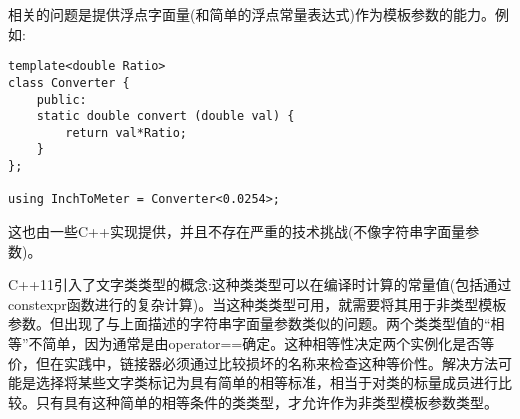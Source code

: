 相关的问题是提供浮点字面量(和简单的浮点常量表达式)作为模板参数的能力。例如:

\begin{lstlisting}[style=styleCXX]
template<double Ratio>
class Converter {
	public:
	static double convert (double val) {
		return val*Ratio;
	}
};

using InchToMeter = Converter<0.0254>;
\end{lstlisting}

这也由一些C++实现提供，并且不存在严重的技术挑战(不像字符串字面量参数)。

C++11引入了文字类类型的概念:这种类类型可以在编译时计算的常量值(包括通过constexpr函数进行的复杂计算)。当这种类类型可用，就需要将其用于非类型模板参数。但出现了与上面描述的字符串字面量参数类似的问题。两个类类型值的“相等”不简单，因为通常是由operator==确定。这种相等性决定两个实例化是否等价，但在实践中，链接器必须通过比较损坏的名称来检查这种等价性。解决方法可能是选择将某些文字类标记为具有简单的相等标准，相当于对类的标量成员进行比较。只有具有这种简单的相等条件的类类型，才允许作为非类型模板参数类型。




































